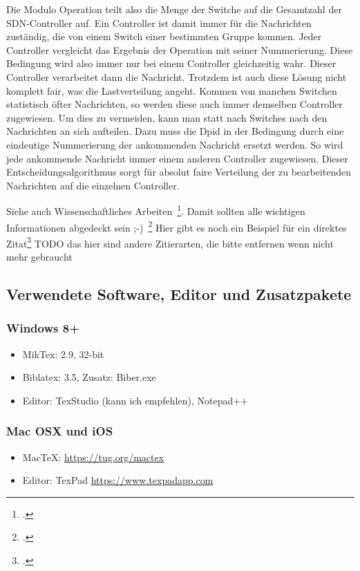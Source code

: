 Die Modulo Operation teilt also die Menge der Switche auf die Gesamtzahl der \ac{SDN}-Controller auf. Ein Controller ist damit immer für die Nachrichten zuständig, die von einem Switch einer bestimmten Gruppe kommen. 
Jeder Controller vergleicht das Ergebnis der Operation mit seiner Nummerierung. Diese Bedingung wird also immer nur bei einem Controller gleichzeitig wahr. Dieser Controller verarbeitet dann die Nachricht. 
Trotzdem ist auch diese Lösung nicht komplett fair, was die Lastverteilung angeht. Kommen von manchen Switchen statistisch öfter Nachrichten, so werden diese auch immer demselben Controller zugewiesen. Um dies zu vermeiden, 
kann man statt nach Switches nach den Nachrichten an sich aufteilen. Dazu muss die Dpid in der Bedingung durch eine eindeutige Nummerierung der ankommenden Nachricht ersetzt werden. 
So wird jede ankommende Nachricht immer einem anderen Controller zugewiesen. Dieser Entscheidungsalgorithmus sorgt für absolut faire Verteilung der zu bearbeitenden Nachrichten auf die einzelnen Controller.






Siehe auch Wissenschaftliches Arbeiten~\footcite[\vglf][S. 1]{Balzert.2008}. %
Damit sollten alle wichtigen Informationen abgedeckt sein ;-)~\footcite[\vglf][]{Balzert.2008} %
Hier gibt es noch ein Beispiel für ein direktes Zitat\footcite[][]{Balzert.2008} %
TODO das hier sind andere Zitierarten, die bitte entfernen wenn nicht mehr gebraucht






\subsection{Verwendete Software, Editor und Zusatzpakete}
\subsubsection{Windows 8+}
\begin{itemize}
\item MikTex: 2.9, 32-bit
\item Biblatex: 3.5, Zusatz: Biber.exe
\item Editor: TexStudio (kann ich empfehlen), Notepad++
\end{itemize}

\subsubsection{Mac OSX und iOS}
\begin{itemize}
\item MacTeX: \url{https://tug.org/mactex}
\item Editor: TexPad \url{https://www.texpadapp.com}
\end{itemize}

